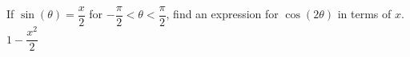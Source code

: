 {If $\sin(\theta) = \dfrac{x}{2}$ for $-\dfrac{\pi}{2} < \theta < \dfrac{\pi}{2}$, find an expression for $\cos(2\theta)$ in terms of $x$.}
{$1 - \dfrac{x^{2}}{2}$}